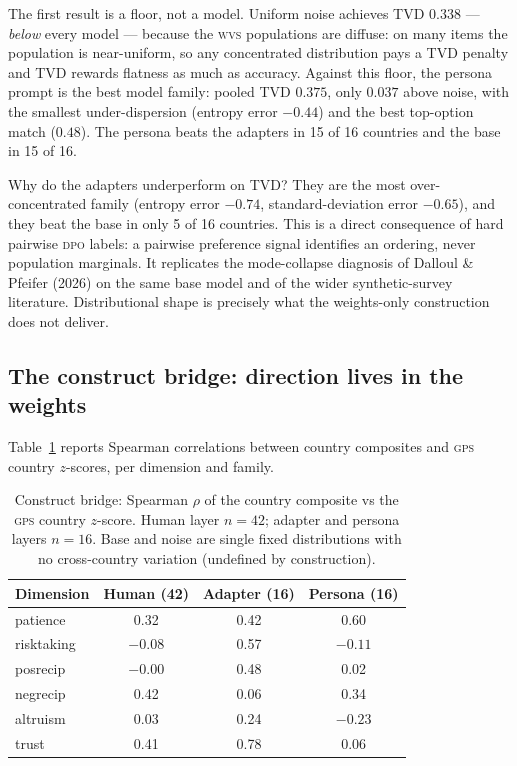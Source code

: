 \documentclass[10pt,letterpaper]{article}
\newcommand{\WVS}{\textsc{wvs}}
\newcommand{\GPS}{\textsc{gps}}
\newcommand{\DPO}{\textsc{dpo}}
\begin{document}
The first result is a floor, not a model. Uniform noise achieves TVD $0.338$ --- \emph{below} every model --- because the \WVS{} populations are diffuse: on many items the population is near-uniform, so any concentrated distribution pays a TVD penalty and TVD rewards flatness as much as accuracy. Against this floor, the persona prompt is the best model family: pooled TVD $0.375$, only $0.037$ above noise, with the smallest under-dispersion (entropy error $-0.44$) and the best top-option match ($0.48$). The persona beats the adapters in 15 of 16 countries and the base in 15 of 16.

Why do the adapters underperform on TVD? They are the most over-concentrated family (entropy error $-0.74$, standard-deviation error $-0.65$), and they beat the base in only 5 of 16 countries. This is a direct consequence of hard pairwise \DPO{} labels: a pairwise preference signal identifies an ordering, never population marginals. It replicates the mode-collapse diagnosis of Dalloul \& Pfeifer (2026) on the same base model and of the wider synthetic-survey literature. Distributional shape is precisely what the weights-only construction does not deliver.

\subsection{The construct bridge: direction lives in the weights}
Table~\ref{tab:res-bridge} reports Spearman correlations between country composites and \GPS{} country $z$-scores, per dimension and family.

\begin{table}[H]
\centering\small
\caption{Construct bridge: Spearman $\rho$ of the country composite vs the \GPS{} country $z$-score. Human layer $n=42$; adapter and persona layers $n=16$. Base and noise are single fixed distributions with no cross-country variation (undefined by construction).}\label{tab:res-bridge}
\begin{tabular}{lccc}
\toprule
Dimension & Human (42) & Adapter (16) & Persona (16)\\
\midrule
patience & 0.32 & 0.42 & 0.60\\
risktaking & $-0.08$ & 0.57 & $-0.11$\\
posrecip & $-0.00$ & 0.48 & 0.02\\
negrecip & 0.42 & 0.06 & 0.34\\
altruism & 0.03 & 0.24 & $-0.23$\\
trust & 0.41 & 0.78 & 0.06\\
\bottomrule
\end{tabular}
\end{table}
\end{document}
